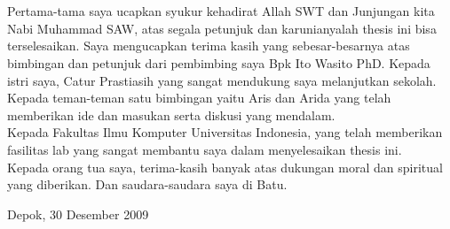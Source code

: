 \chapter*{\kataPengantar}
Pertama-tama saya ucapkan syukur kehadirat Allah SWT dan Junjungan kita Nabi Muhammad SAW, atas segala petunjuk dan karunianyalah thesis ini bisa terselesaikan. Saya mengucapkan terima kasih yang sebesar-besarnya atas bimbingan dan petunjuk dari pembimbing saya Bpk Ito Wasito PhD. Kepada istri saya, Catur Prastiasih yang sangat mendukung  saya melanjutkan sekolah. Kepada teman-teman satu bimbingan yaitu Aris dan Arida yang telah memberikan ide dan masukan serta diskusi yang mendalam. \\
Kepada Fakultas Ilmu Komputer Universitas Indonesia, yang telah memberikan fasilitas lab yang sangat membantu saya dalam menyelesaikan thesis ini. \\
Kepada orang tua saya, terima-kasih banyak atas dukungan moral dan spiritual yang diberikan. Dan saudara-saudara saya di Batu.

\vspace*{0.1cm}
\begin{flushright}
Depok, 30 Desember 2009\\[0.1cm]
\vspace*{1cm}
\penulis

\end{flushright}